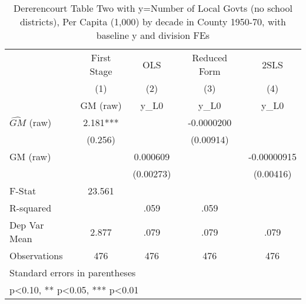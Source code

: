 \begin{table}[htbp]\centering
\def\sym#1{\ifmmode^{#1}\else\(^{#1}\)\fi}
\caption{Dererencourt Table Two with y=Number of Local Govts (no school districts), Per Capita (1,000) by decade in County 1950-70, with baseline y and division FEs}
\begin{tabular}{l*{4}{c}}
\toprule
                    & First Stage   &         OLS   &Reduced Form   &        2SLS   \\
                    &\multicolumn{1}{c}{(1)}&\multicolumn{1}{c}{(2)}&\multicolumn{1}{c}{(3)}&\multicolumn{1}{c}{(4)}\\
                    &\multicolumn{1}{c}{GM  (raw)}&\multicolumn{1}{c}{y\_L0}&\multicolumn{1}{c}{y\_L0}&\multicolumn{1}{c}{y\_L0}\\
\midrule
$\hat{GM}$ (raw)    &       2.181***&               &  -0.0000200   &               \\
                    &     (0.256)   &               &   (0.00914)   &               \\
\addlinespace
GM  (raw)           &               &    0.000609   &               & -0.00000915   \\
                    &               &   (0.00273)   &               &   (0.00416)   \\
\midrule
F-Stat              &      23.561   &               &               &               \\
R-squared           &               &        .059   &        .059   &               \\
Dep Var Mean        &       2.877   &        .079   &        .079   &        .079   \\
Observations        &         476   &         476   &         476   &         476   \\
\bottomrule
\multicolumn{5}{l}{\footnotesize Standard errors in parentheses}\\
\multicolumn{5}{l}{\footnotesize * p<0.10, ** p<0.05, *** p<0.01}\\
\end{tabular}
\end{table}

